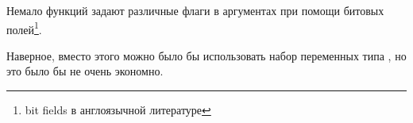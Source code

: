 \mysection{\BitfieldsChapter}
\label{sec:bitfields}

Немало функций задают различные флаги в аргументах при помощи битовых полей\footnote{bit fields в англоязычной литературе}.

Наверное, вместо этого можно было бы использовать набор переменных типа \Tbool, но это было бы 
не очень экономно.








